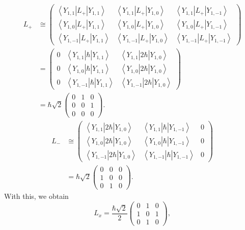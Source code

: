 \documentclass[11pt, letterpaper]{article}
\renewcommand{\ket}[1]{\left\vert #1 \right\rangle}
\renewcommand{\bra}[1]{\left\langle #1 \right\vert}
\begin{document}
\begin{enumerate}
\begin{align*}
			L_+ &\cong \begin{pmatrix}
			\bra{Y_{1,1} } L_+ \ket{Y_{1,1} }  & \bra{Y_{1,1} } L_+ \ket{Y_{1,0} }  & \bra{Y_{1,1} } L_+\ket{Y_{1,-1} }  \\
			\bra{Y_{1,0} } L_+\ket{Y_{1,1} }  & \bra{Y_{1,0} } L_+\ket{Y_{1,0} }  & \bra{Y_{1,0} } L_+\ket{Y_{1,-1} }  \\
			\bra{Y_{1,-1} } L_+\ket{Y_{1,1} }  & \bra{Y_{1,-1} } L_+\ket{Y_{1,0} }  & \bra{Y_{1,-1} } L_+\ket{Y_{1,-1} } 
			\end{pmatrix}\\
			    &=\begin{pmatrix}
			    0 & \bra{Y_{1,1} } \hbar \ket{Y_{1,1} }  & \bra{Y_{1,1} } 2\hbar \ket{Y_{1,0} }  \\
			    0 & \bra{Y_{1,0} } \hbar \ket{Y_{1,1} }  & \bra{Y_{1,0} } 2\hbar \ket{Y_{1,0} }  \\
			    0 & \bra{Y_{1,-1} } \hbar \ket{Y_{1,1} }  & \bra{Y_{1,-1} } 2\hbar \ket{Y_{1,0} } 
			    \end{pmatrix}\\
			    &=\hbar \sqrt{2}\begin{pmatrix}
			    0 & 1 & 0 \\
			    0 & 0 & 1 \\
			    0 & 0 & 0
			    \end{pmatrix}
		.\end{align*}
		\begin{align*}
			L_- &\cong \begin{pmatrix}
			\bra{Y_{1,1} } 2\hbar \ket{Y_{1,0} }  & \bra{Y_{1,1} } \hbar \ket{Y_{1,-1} }  & 0 \\
			\bra{Y_{1,0} } 2\hbar \ket{Y_{1,0} }  & \bra{Y_{1,0} } \hbar \ket{Y_{1,-1} }  & 0 \\
			\bra{Y_{1,-1} } 2\hbar \ket{Y_{1,0} }  & \bra{Y_{1,-1} } \hbar \ket{Y_{1,-1} }  & 0
			\end{pmatrix}\\
			    &=\hbar\sqrt{2} \begin{pmatrix}
			    0 & 0 & 0 \\
			    1 & 0 & 0 \\
			    0 & 1 & 0
			    \end{pmatrix}
		.\end{align*}
		With this, we obtain
		\[
			L_x=\frac{\hbar \sqrt{2}}{2} \begin{pmatrix}
			0 & 1  & 0 \\
			1  & 0 & 1  \\
			0 & 1  & 0
			\end{pmatrix},
\]
\end{enumerate}
\end{document}
